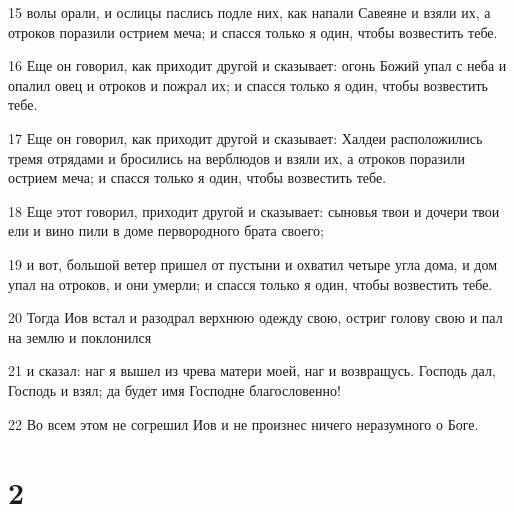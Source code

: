 \par 15 волы орали, и ослицы паслись подле них, как напали Савеяне и взяли их, а отроков поразили острием меча; и спасся только я один, чтобы возвестить тебе.
\par 16 Еще он говорил, как приходит другой и сказывает: огонь Божий упал с неба и опалил овец и отроков и пожрал их; и спасся только я один, чтобы возвестить тебе.
\par 17 Еще он говорил, как приходит другой и сказывает: Халдеи расположились тремя отрядами и бросились на верблюдов и взяли их, а отроков поразили острием меча; и спасся только я один, чтобы возвестить тебе.
\par 18 Еще этот говорил, приходит другой и сказывает: сыновья твои и дочери твои ели и вино пили в доме первородного брата своего;
\par 19 и вот, большой ветер пришел от пустыни и охватил четыре угла дома, и дом упал на отроков, и они умерли; и спасся только я один, чтобы возвестить тебе.
\par 20 Тогда Иов встал и разодрал верхнюю одежду свою, остриг голову свою и пал на землю и поклонился
\par 21 и сказал: наг я вышел из чрева матери моей, наг и возвращусь. Господь дал, Господь и взял; да будет имя Господне благословенно!
\par 22 Во всем этом не согрешил Иов и не произнес ничего неразумного о Боге.

\chapter{2}

